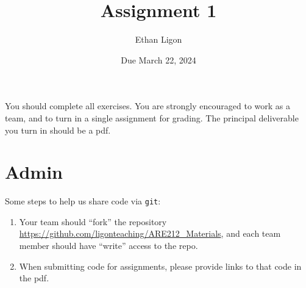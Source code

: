 \documentclass[12pt]{amsart}
\author{Ethan Ligon}
\date{Due March 22, 2024}
\title{Assignment 1}
\begin{document}
\maketitle
You should complete all exercises.   You are strongly encouraged to work as a  team, and to turn in a single assignment for grading.   The principal deliverable you turn in should be a pdf.
\section{Admin}
\label{sec:org5b3867c}
Some steps to help us share code via \texttt{git}:
\begin{enumerate}
\item Your team should ``fork'' the repository \url{https://github.com/ligonteaching/ARE212\_Materials}, and each  team member should have ``write'' access to the repo.
\item When submitting code for assignments, please provide links to that code in the pdf.
\end{enumerate}
\end{document}
